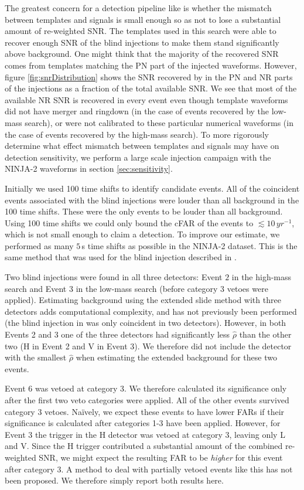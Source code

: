 The greatest concern for a detection pipeline like \ihope{} is whether 
the mismatch between templates and signals is small enough so as not to lose a 
substantial amount of re-weighted SNR. The templates used in this 
search were able to recover enough SNR of the blind injections to make them 
stand
significantly above background. One might think that the majority of the
recovered SNR comes from templates matching the PN part of the injected
waveforms.  However, figure \ref{fig:snrDistribution} shows the SNR recovered by
\ihope{} in the PN and NR parts of the injections as a fraction of the total
available SNR.  We see that most of the available NR SNR is recovered in every
event even though template waveforms did not have merger and ringdown (in the
case of events recovered by the low-mass search), or were not calibrated to
these particular numerical waveforms (in the case of events recovered by the
high-mass search). To more rigorously determine what effect mismatch between
templates and signals may have on detection sensitivity, we perform a large
scale injection campaign with the NINJA-2 waveforms in section 
\ref{sec:sensitivity}.

Initially we used 100 time shifts to identify candidate events. All of the
coincident events associated with the blind injections were louder than
all background in the 100 time shifts. These were the only events to be
louder than all background. Using 100 time shifts we could only bound the cFAR
of the events to $\lesssim 10\,yr^{-1}$, which is not small enough to claim a
detection. To improve our estimate, we performed as many $5\,$s time shifts as
possible in the NINJA-2 dataset. This is the same
method that was used for the blind injection described in
\cite{Colaboration:2011np}. 

Two blind injections were found in all three detectors: Event $2$ in the
high-mass search and Event $3$ in the low-mass search (before category 3 vetoes
were applied).  Estimating background using the extended slide method with
three detectors adds computational complexity, and has not previously been
performed (the blind injection in \cite{Colaboration:2011np} was only
coincident in two detectors). However, in both Events 2 and 3 one of the three
detectors had significantly less $\hat{\rho}$ than the other two (H in Event 2
and V in Event 3). We therefore did not include the detector with the smallest
$\hat{\rho}$ when estimating the extended background for these two events. 

Event 6 was vetoed at category 3. We therefore calculated its significance only
after the first two veto categories were applied. All of the other events
survived category 3 vetoes. Na\"{i}vely, we expect these events to have lower
FARs if their significance is calculated after categories 1-3 have been
applied. However, for Event 3 the trigger in the H detector was vetoed at
category 3, leaving only L and V. Since the H trigger contributed a substantial
amount of the combined re-weighted SNR, we might expect the resulting FAR to be 
\emph{higher} for this event after category 3. A method to deal 
with partially vetoed events like this has not been proposed. We therefore 
simply report both results here.

